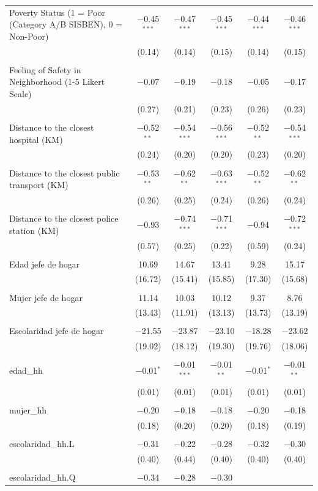 \begin{table}[H]
\begin{tabularx}{0.9\textwidth}{@{\extracolsep{-7pt}}lccccc}
 Poverty Status (1 = Poor (Category A/B SISBEN), 0 = Non-Poor) & $-$0.45$^{***}$ & $-$0.47$^{***}$ & $-$0.45$^{***}$ & $-$0.44$^{***}$ & $-$0.46$^{***}$ \\    & (0.14) & (0.14) & (0.15) & (0.14) & (0.15) \\    & & & & & \\   Feeling of Safety in Neighborhood (1-5 Likert Scale) & $-$0.07 & $-$0.19 & $-$0.18 & $-$0.05 & $-$0.17 \\    & (0.27) & (0.21) & (0.23) & (0.26) & (0.23) \\    & & & & & \\   Distance to the closest hospital (KM) & $-$0.52$^{**}$ & $-$0.54$^{***}$ & $-$0.56$^{***}$ & $-$0.52$^{**}$ & $-$0.54$^{***}$ \\    & (0.24) & (0.20) & (0.20) & (0.23) & (0.20) \\    & & & & & \\   Distance to the closest public transport  (KM) & $-$0.53$^{**}$ & $-$0.62$^{**}$ & $-$0.63$^{***}$ & $-$0.52$^{**}$ & $-$0.62$^{**}$ \\    & (0.26) & (0.25) & (0.24) & (0.26) & (0.24) \\    & & & & & \\   Distance to the closest police station (KM) & $-$0.93 & $-$0.74$^{***}$ & $-$0.71$^{***}$ & $-$0.94 & $-$0.72$^{***}$ \\    & (0.57) & (0.25) & (0.22) & (0.59) & (0.24) \\    & & & & & \\   Edad jefe de hogar & 10.69 & 14.67 & 13.41 & 9.28 & 15.17 \\    & (16.72) & (15.41) & (15.85) & (17.30) & (15.68) \\    & & & & & \\   Mujer jefe de hogar & 11.14 & 10.03 & 10.12 & 9.37 & 8.76 \\    & (13.43) & (11.91) & (13.13) & (13.73) & (13.19) \\    & & & & & \\   Escolaridad jefe de hogar & $-$21.55 & $-$23.87 & $-$23.10 & $-$18.28 & $-$23.62 \\    & (19.02) & (18.12) & (19.30) & (19.76) & (18.06) \\    & & & & & \\   edad\_hh & $-$0.01$^{*}$ & $-$0.01$^{***}$ & $-$0.01$^{**}$ & $-$0.01$^{*}$ & $-$0.01$^{**}$ \\    & (0.01) & (0.01) & (0.01) & (0.01) & (0.01) \\    & & & & & \\   mujer\_hh & $-$0.20 & $-$0.18 & $-$0.18 & $-$0.20 & $-$0.18 \\    & (0.18) & (0.20) & (0.20) & (0.18) & (0.19) \\    & & & & & \\   escolaridad\_hh.L & $-$0.31 & $-$0.22 & $-$0.28 & $-$0.32 & $-$0.30 \\    & (0.40) & (0.44) & (0.40) & (0.40) & (0.40) \\    & & & & & \\   escolaridad\_hh.Q & $-$0.34 & $-$0.28 & $-$0.30 & 
\end{tabularx}
\end{table}
